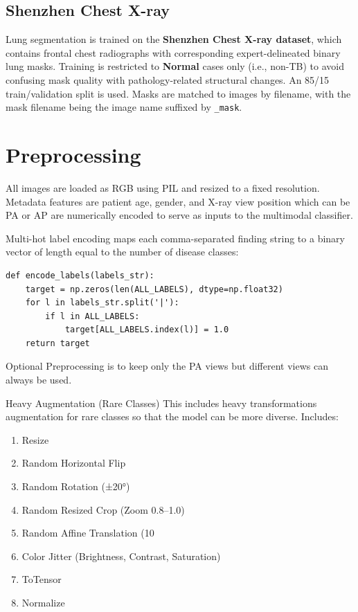 \subsection{Shenzhen Chest X-ray}

Lung segmentation is trained on the \textbf{Shenzhen Chest X-ray dataset}, which contains frontal chest radiographs with corresponding expert-delineated binary lung masks. Training is restricted to \textbf{Normal} cases only (i.e., non-TB) to avoid confusing mask quality with pathology-related structural changes. An 85/15 train/validation split is used. Masks are matched to images by filename, with the mask filename being the image name suffixed by \texttt{\_mask}.


\section{Preprocessing}

All images are loaded as RGB using PIL and resized to a fixed resolution. Metadata features are patient age, gender, and X-ray view position which can be PA or AP are numerically encoded to serve as inputs to the multimodal classifier.

Multi-hot label encoding maps each comma-separated finding string to a binary vector of length equal to the number of disease classes:

\begin{lstlisting}[style=pythonstyle, caption={Multi-hot label encoding}]
def encode_labels(labels_str):
    target = np.zeros(len(ALL_LABELS), dtype=np.float32)
    for l in labels_str.split('|'):
        if l in ALL_LABELS:
            target[ALL_LABELS.index(l)] = 1.0
    return target
\end{lstlisting}

Optional Preprocessing is to keep only the PA views but different views can always be used.

Heavy Augmentation (Rare Classes)
This includes heavy transformations augmentation for rare classes so that the model can be more diverse.
Includes:
\begin{enumerate}
    \item Resize

    \item Random Horizontal Flip
    \item Random Rotation (±20°)
    \item Random Resized Crop (Zoom 0.8–1.0)
    \item Random Affine Translation (10%
    \item Color Jitter (Brightness, Contrast, Saturation)
    \item ToTensor 
    \item Normalize

\end{enumerate}

